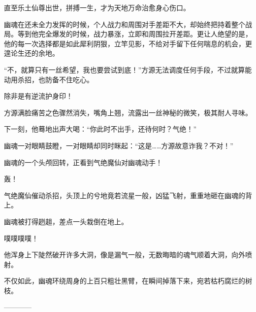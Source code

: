 \begin{this_body}
直至乐土仙尊出世，拼搏一生，才为天地万命治愈身心伤口。

幽魂在还未全力发挥的时候，个人战力和周围对手差距不大，却始终把持着整个战局。等到他完全爆发的时候，战力暴涨，立即和周围拉开差距。更让人绝望的是，他的每一次选择都是如此犀利阴狠，立竿见影，不给对手留下任何喘息的机会，更遑论生还的余地。

“不，就算只有一丝希望，我也要尝试到底！”方源无法调度任何手段，不过就算能动用杀招，也防备不住吃心。

除非是有逆流护身印！

方源满脸痛苦之色骤然消失，嘴角上翘，流露出一丝神秘的微笑，极其耐人寻味。

下一刻，他蓦地出声大喝：“你此时不出手，还待何时？气绝！”

幽魂一对眼睛鼓瞪，一对眼睛却同时眯起：“这是……方源故意诈我？不对！”

幽魂的一个头颅回转，正看到气绝魔仙对幽魂动手！

轰！

气绝魔仙催动杀招，头顶上的兮地竟若流星一般，凶猛飞射，重重地砸在幽魂的背上。

幽魂被打得趔趄，差点一头栽倒在地上。

噗噗噗噗！

他浑身上下陡然破开许多大洞，像是漏气一般，无数晦暗的魂气顺着大洞，向外喷射。

不仅如此，幽魂环绕周身的上百只粗壮黑臂，在瞬间掉落下来，宛若枯朽腐烂的树枝。

------------

\end{this_body}


